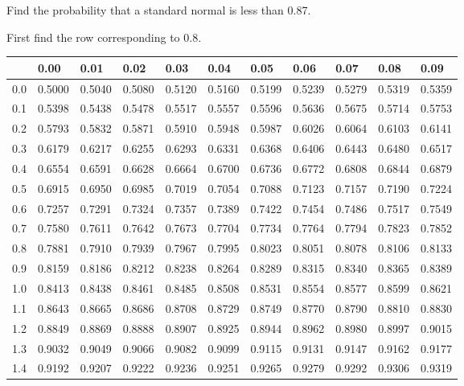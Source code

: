 \begin{frame}{\small Find the probability that a standard normal is less than 0.87.}
  
{\small First find the row corresponding to 0.8.}

  {
\fontsize{5pt}{5pt}
\selectfont

\begin{tabular}{l|llllllllll}
     & 0.00   & 0.01   & 0.02   & 0.03   & 0.04   & 0.05   & 0.06   & 0.07   & 0.08  & 0.09 \\ \hline
0.0 & 0.5000 & 0.5040 & 0.5080 & 0.5120 & 0.5160 & 0.5199 & 0.5239 & 0.5279 & 0.5319 & 0.5359 \\ 
0.1 & 0.5398 & 0.5438 & 0.5478 & 0.5517 & 0.5557 & 0.5596 & 0.5636 & 0.5675 & 0.5714 & 0.5753 \\ 
0.2 & 0.5793 & 0.5832 & 0.5871 & 0.5910 & 0.5948 & 0.5987 & 0.6026 & 0.6064 & 0.6103 & 0.6141 \\ 
0.3 & 0.6179 & 0.6217 & 0.6255 & 0.6293 & 0.6331 & 0.6368 & 0.6406 & 0.6443 & 0.6480 & 0.6517 \\ 
0.4 & 0.6554 & 0.6591 & 0.6628 & 0.6664 & 0.6700 & 0.6736 & 0.6772 & 0.6808 & 0.6844 & 0.6879 \\ 
0.5 & 0.6915 & 0.6950 & 0.6985 & 0.7019 & 0.7054 & 0.7088 & 0.7123 & 0.7157 & 0.7190 & 0.7224 \\ 
0.6 & 0.7257 & 0.7291 & 0.7324 & 0.7357 & 0.7389 & 0.7422 & 0.7454 & 0.7486 & 0.7517 & 0.7549 \\ 
0.7 & 0.7580 & 0.7611 & 0.7642 & 0.7673 & 0.7704 & 0.7734 & 0.7764 & 0.7794 & 0.7823 & 0.7852 \\ 
\rowcolor{red}0.8 & 0.7881 & 0.7910 & 0.7939 & 0.7967 & 0.7995 & 0.8023 & 0.8051 & 0.8078 & 0.8106 & 0.8133 \\ 
0.9 & 0.8159 & 0.8186 & 0.8212 & 0.8238 & 0.8264 & 0.8289 & 0.8315 & 0.8340 & 0.8365 & 0.8389 \\ 
1.0 & 0.8413 & 0.8438 & 0.8461 & 0.8485 & 0.8508 & 0.8531 & 0.8554 & 0.8577 & 0.8599 & 0.8621 \\ 
1.1 & 0.8643 & 0.8665 & 0.8686 & 0.8708 & 0.8729 & 0.8749 & 0.8770 & 0.8790 & 0.8810 & 0.8830 \\ 
1.2 & 0.8849 & 0.8869 & 0.8888 & 0.8907 & 0.8925 & 0.8944 & 0.8962 & 0.8980 & 0.8997 & 0.9015 \\ 
1.3 & 0.9032 & 0.9049 & 0.9066 & 0.9082 & 0.9099 & 0.9115 & 0.9131 & 0.9147 & 0.9162 & 0.9177 \\ 
1.4 & 0.9192 & 0.9207 & 0.9222 & 0.9236 & 0.9251 & 0.9265 & 0.9279 & 0.9292 & 0.9306 & 0.9319 \\ 

\end{tabular}}
\end{frame}
